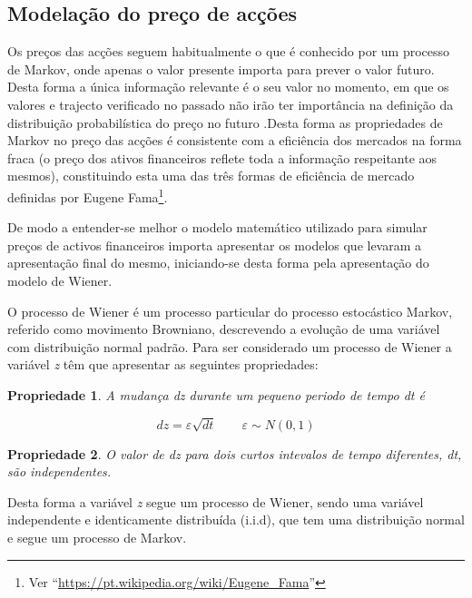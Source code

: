 \documentclass[
  12pt,
  a4paper,
  openany]{book}
\newtheorem{proposition}{Propriedade}[chapter]
\theoremstyle{definition}
\theoremstyle{definition}
\theoremstyle{definition}
\theoremstyle{remark}
\begin{document}
\hypertarget{modelauxe7uxe3o-do-preuxe7o-de-acuxe7uxf5es}{%
\subsection{Modelação do preço de acções}\label{modelauxe7uxe3o-do-preuxe7o-de-acuxe7uxf5es}}

Os preços das acções seguem habitualmente o que é conhecido por um processo de Markov, onde apenas o valor presente importa para prever o valor futuro. Desta forma a única informação relevante é o seu valor no momento, em que os valores e trajecto verificado no passado não irão ter importância na definição da distribuição probabilística do preço no futuro \citep{Hull2018}.Desta forma as propriedades de Markov no preço das acções é consistente com a eficiência dos mercados na forma fraca (o preço dos ativos financeiros reflete toda a informação respeitante aos mesmos), constituindo esta uma das três formas de eficiência de mercado definidas por Eugene Fama\footnote{Ver ``\url{https://pt.wikipedia.org/wiki/Eugene_Fama}''}.

De modo a entender-se melhor o modelo matemático utilizado para simular preços de activos financeiros importa apresentar os modelos que levaram a apresentação final do mesmo, iniciando-se desta forma pela apresentação do modelo de Wiener.

O processo de Wiener é um processo particular do processo estocástico Markov, referido como movimento Browniano, descrevendo a evolução de uma variável com distribuição normal padrão. Para ser considerado um processo de Wiener a variável \emph{z} têm que apresentar as seguintes propriedades:

\begin{proposition}
\protect\hypertarget{prp:wiener1}{}{\label{prp:wiener1} }A mudança dz durante um pequeno periodo de tempo dt é

\[dz = \varepsilon \sqrt{dt}\qquad   \varepsilon \sim N(0,1)\]
\end{proposition}

\begin{proposition}
\protect\hypertarget{prp:wiener2}{}{\label{prp:wiener2} }O valor de dz para dois curtos intevalos de tempo diferentes, dt, são independentes.
\end{proposition}

Desta forma a variável \emph{z} segue um processo de Wiener, sendo uma variável independente e identicamente distribuída (i.i.d), que tem uma distribuição normal e segue um processo de Markov.
\end{document}
